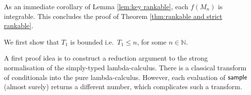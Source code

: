 As an immediate corollary of Lemma \ref{lem:key rankable}, each $f(M_n)$ is integrable.
This concludes the proof of Theorem \ref{thm:rankable and strict rankable}. 

\medskip

\newcommand\transform[1]{{\ulcorner{#1}\urcorner}}

\iffalse
As before, fix a $M \in \Lambda^0$.
Recall the random variables on $(S, \calF, \mu)$:
\begin{align*}
T_0(s) & := 0 \\
T_{n+1}(s) & := \min \{ k \mid k>T_n(s), M_k(s) \textrm{ a value or of form } E[\tY \lambda x. N] \}
\end{align*}
\fi

\TnBounded*

We first show that $T_1$ is bounded i.e.~$T_1 \leq n$, for some $n \in \mathbb N$.

A first proof idea is to construct a reduction argument to the strong normalisation of the simply-typed lambda-calculus.
 There is a classical transform of conditionals into the pure lambda-calculus.
However, each evaluation of $\mathsf{sample}$ (almost surely) returns a different number, which complicates such a transform.

